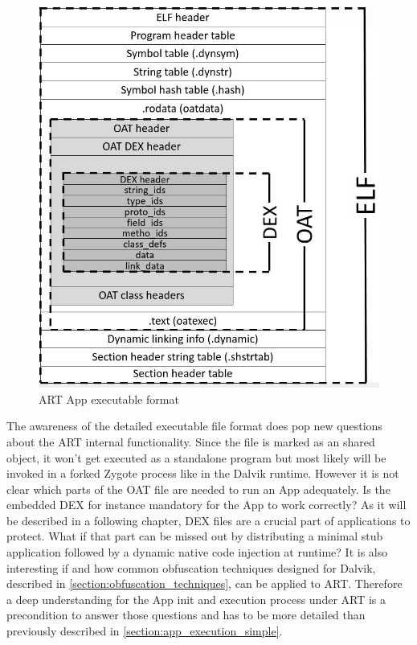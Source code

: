 \begin{figure}[htb]
  \centering
  \includegraphics[scale=0.6]{figures/andelf_format}
  \caption[ART App executable format]{ART App executable format}
  \label{fig:andelf_format}
\end{figure}

The awareness of the detailed executable file format does pop
new questions about the ART internal functionality.
Since the file is marked as an shared object, it won't get
executed as a standalone program but most likely will be
invoked in a forked Zygote process like in the Dalvik runtime.
However it is not clear which parts of the OAT file are
needed to run an App adequately. Is the embedded DEX for instance
mandatory for the App to work correctly? As it will be described
in a following chapter, DEX files are
a crucial part of applications to protect. What if that part
can be missed out by distributing a minimal stub application
followed by a dynamic native code injection at runtime?
It is also interesting if and how common obfuscation
techniques designed for Dalvik, described in \autoref{section:obfuscation_techniques}, can be applied to ART.
Therefore a deep understanding for the App init and execution
process under ART is a precondition to answer those
questions and has to be more detailed than previously described in
\autoref{section:app_execution_simple}.

